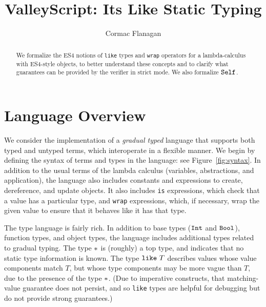 \documentclass{article}
\newcommand{\Int}{\t{Int}}
\newcommand{\Bool}{\t{Bool}}
\newcommand{\dynamic}{\t{*}}
\renewcommand{\t}[1]{{\tt #1}}
\newcommand{\wrapty}[1]{\t{XXXX wrap}~#1}
\newcommand{\likety}[1]{\t{like}~#1}
\newcommand{\self}{\t{Self}}
\begin{document}
\title{ValleyScript: Its Like Static Typing
}
\author{Cormac Flanagan}

\maketitle

\begin{abstract}
We formalize the ES4 notions of \t{like} types and \t{wrap} operators for a lambda-calculus with ES4-style objects,
to better understand these concepts and to clarify what guarantees can be provided by the verifier in strict mode.
We also formalize $\self$.
\end{abstract}

\section{Language Overview}

We consider the implementation of a \emph{gradual typed} language that supports both
typed and untyped terms, which interoperate in a flexible manner.
We begin by defining the syntax of terms and types in the language: see Figure~\ref{fig:syntax}.
In addition to the usual terms of the lambda calculus (variables, abstractions, and application), 
the language also includes constants and expressions to create, dereference, and update objects.
It also includes \t{is} expressions, which check that a value has a particular type,
and \t{wrap} expressions, which, if necessary, wrap the given value to ensure that it behaves like it has that type. 

The type language is fairly rich. In addition to  base types ($\Int$ and $\Bool$), function types,
and object types, the language includes additional types related to gradual typing.
The type $\dynamic$ is (roughly) a top type, and indicates that no static type information is known.
The type $\likety{T}$ describes values whose value components match $T$, but whose type components may be more vague than $T$, due to the presence of the type $\dynamic$. (Due to imperative constructs, that matching-value guarantee does not persist, and so \t{like} types are helpful for debugging but do not provide strong guarantees.)


\end{document}
